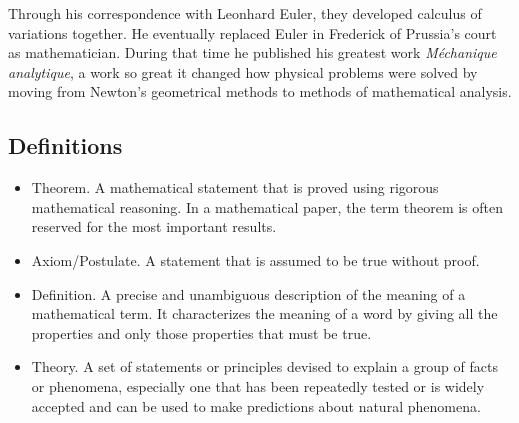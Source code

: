 Through his correspondence with Leonhard Euler, they developed 
calculus of variations together. He eventually replaced Euler in 
Frederick of Prussia's court as mathematician. During that time he
published his greatest work \emph{Méchanique analytique}, a work so great
it changed how physical problems were solved by moving from 
Newton's geometrical methods to methods of mathematical analysis.

\subsection{Definitions}
\begin{itemize}
 \item Theorem. A mathematical statement that is proved using 
 rigorous mathematical reasoning.  
  In a mathematical paper, the term theorem is often reserved for
  the most important results.
 \item Axiom/Postulate. A  statement  that  is  assumed  to  be  true  without  proof.
 \item Definition. A precise and unambiguous description of the meaning 
 of a mathematical term.  
 It characterizes the meaning of a word by giving all the properties
 and only those properties that must be true.
 \item Theory.  A set of statements or principles devised to 
 explain a group of facts or phenomena, 
 especially one that has been repeatedly tested or is 
 widely accepted and can be used to make predictions 
 about natural phenomena.
\end{itemize}


